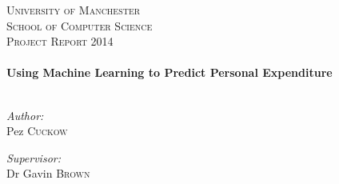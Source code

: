 \begin{titlepage}
\begin{center}

\textsc{\LARGE University of Manchester}\\[1.5cm]
\textsc{\Large School of Computer Science\\Project Report 2014}\\[0.5cm]

\HRule \\[0.4cm]
{ \huge \bfseries Using Machine Learning to Predict Personal Expenditure \\[0.4cm] }
\HRule \\[1.5cm]

\begin{minipage}{0.4\textwidth}
\begin{flushleft} \large
\emph{Author:}\\
Pez \textsc{Cuckow}
\end{flushleft}
\end{minipage}
\begin{minipage}{0.4\textwidth}
\begin{flushright} \large
\emph{Supervisor:} \\
Dr Gavin \textsc{Brown}
\end{flushright}
\end{minipage}

\vfill


\end{center}
\end{titlepage}